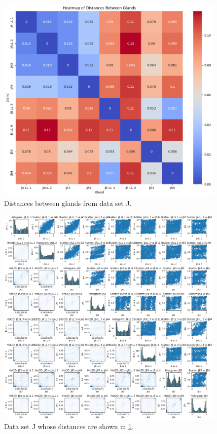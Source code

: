 \begin{figure}[h]
    \centering
    \includegraphics[width=\textwidth]{Chapter_5/figures/data_example_distances.png}
    \caption{Distances between glands from data set J.}
    \label{fig:data_distances}
\end{figure}
\begin{figure}[h]
    \centering
    \includegraphics[width=\textwidth]{Chapter_5/figures/data_example_corrs.png}
    \caption{Data set J whose distances are shown in \ref{fig:data_distances}.}
    \label{fig:data_example_corrs}
\end{figure}
\clearpage
